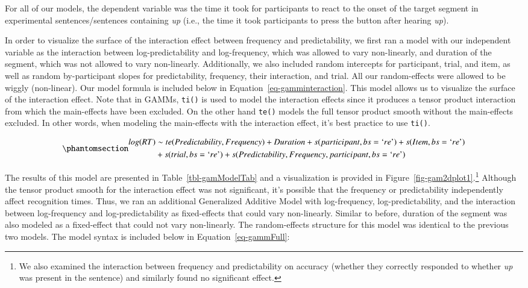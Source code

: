 \documentclass[
  authoryear,
  preprint,
  1p,
  onecolumn]{elsarticle}
\begin{document}
For all of our models, the dependent variable was the time it took for
participants to react to the onset of the target segment in experimental
sentences/sentences containing \emph{up} (i.e., the time it took
participants to press the button after hearing \emph{up}).

In order to visualize the surface of the interaction effect between
frequency and predictability, we first ran a model with our independent
variable as the interaction between log-predictability and
log-frequency, which was allowed to vary non-linearly, and duration of
the segment, which was not allowed to vary non-linearly. Additionally,
we also included random intercepts for participant, trial, and item, as
well as random by-participant slopes for predictability, frequency,
their interaction, and trial. All our random-effects were allowed to be
wiggly (non-linear). Our model formula is included below in
Equation~\ref{eq-gamminteraction}. This model allows us to visualize the
surface of the interaction effect. Note that in GAMMs, \texttt{ti()} is
used to model the interaction effects since it produces a tensor product
interaction from which the main-effects have been excluded. On the other
hand \texttt{te()} models the full tensor product smooth without the
main-effects excluded. In other words, when modeling the main-effects
with the interaction effect, it's best practice to use \texttt{ti()}.

\begin{equation}\phantomsection\label{eq-gamminteraction}{
\begin{aligned}log(RT) & \sim te(Predictability, Frequency) + Duration + s(participant, bs = \text{`}re\text{'}) + s(Item, bs = \text{`}re\text{'}) \\& + s(trial, bs = \text{`}re\text{'}) + s(Predictability, Frequency, participant, bs = \text{`}re\text{'}) \end{aligned}
}\end{equation}

The results of this model are presented in Table~\ref{tbl-gamModelTab}
and a visualization is provided in
Figure~\ref{fig-gam2dplot1}.\footnote{We also examined the interaction
  between frequency and predictability on accuracy (whether they
  correctly responded to whether \emph{up} was present in the sentence)
  and similarly found no significant effect.} Although the tensor
product smooth for the interaction effect was not significant, it's
possible that the frequency or predictability independently affect
recognition times. Thus, we ran an additional Generalized Additive Model
with log-frequency, log-predictability, and the interaction between
log-frequency and log-predictability as fixed-effects that could vary
non-linearly. Similar to before, duration of the segment was also
modeled as a fixed-effect that could not vary non-linearly. The
random-effects structure for this model was identical to the previous
two models. The model syntax is included below in
Equation~\ref{eq-gammFull}:
\end{document}
